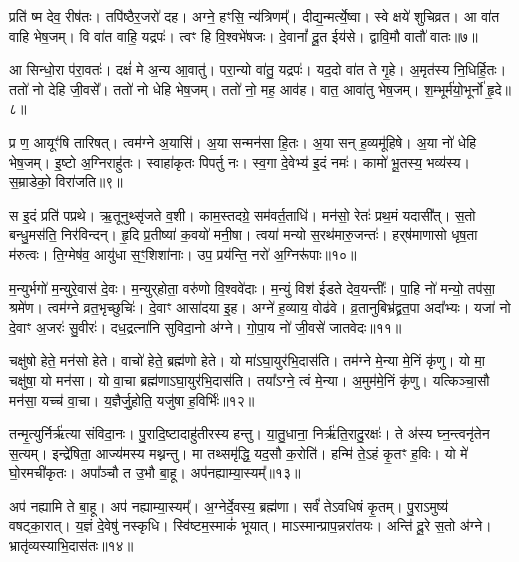 प्रति॑ ष्म देव॒ रीष॑तः।
तपि॑ष्ठैर॒जरो॑ दह।
अग्ने॒ हꣳसि॒ न्य॑त्रिणम्᳚।
दीद्य॒न्मर्त्ये॒ष्वा।
स्वे क्षये॑ शुचिव्रत।
आ वा॑त वाहि भेष॒जम्।
वि वा॑त वाहि॒ यद्रपः॑।
त्वꣳ हि वि॒श्वभे॑षजः।
दे॒वानां᳚ दू॒त ईय॑से।
द्वावि॒मौ वातौ॑ वातः॥७॥

आ सिन्धो॒रा प॑रा॒वतः॑।
दक्षं॑ मे अ॒न्य आ॒वातु॑।
परा॒न्यो वा॑तु॒ यद्रपः॑।
यद॒दो वा॑त ते गृ॒हे।
अ॒मृत॑स्य नि॒धिर्\mbox{}हि॒तः।
ततो॑ नो देहि जी॒वसे᳚।
ततो॑ नो धेहि भेष॒जम्।
ततो॑ नो॒ मह॒ आव॑ह।
वात॒ आवा॑तु भेष॒जम्।
श॒म्भूर्म॑यो॒भूर्नो॑ हृ॒दे॥८॥

प्र ण॒ आयूꣳ॑षि तारिषत्।
त्वम॑ग्ने अ॒यासि॑।
अ॒या सन्मन॑सा हि॒तः।
अ॒या सन् ह॒व्यमू॑हिषे।
अ॒या नो॑ धेहि भेष॒जम्।
इ॒ष्टो अ॒ग्निराहु॑तः।
स्वाहा॑कृतः पिपर्तु नः।
स्व॒गा दे॒वेभ्य॑ इ॒दं नमः॑।
कामो॑ भू॒तस्य॒ भव्य॑स्य।
स॒म्राडेको॒ विरा॑जति॥९॥

स इ॒दं प्रति॑ पप्रथे।
ऋ॒तूनुथ्सृ॑जते व॒शी।
काम॒स्तदग्रे॒ सम॑वर्त॒ताधि॑।
मन॑सो॒ रेतः॑ प्रथ॒मं यदासी᳚त्।
स॒तो बन्धु॒मस॑ति॒ निर॑विन्दन्।
हृ॒दि प्र॒तीष्या॑ क॒वयो॑ मनी॒षा।
त्वया॑ मन्यो स॒रथ॑मारु॒जन्तः॑।
हर्‌\mbox{}ष॑माणासो धृष॒ता म॑रुत्वः।
ति॒ग्मेष॑व॒ आयु॑धा स॒ꣳ॒शिशा॑नाः।
उप॒ प्रय॑न्ति॒ नरो॑ अ॒ग्निरू॑पाः॥१०॥

म॒न्युर्भगो॑ म॒न्युरे॒वास॑ दे॒वः।
म॒न्युर्‌\mbox{}होता॒ वरु॑णो वि॒श्ववे॑दाः।
म॒न्युं विश॑ ईडते देव॒यन्तीः᳚।
पा॒हि नो॑ मन्यो॒ तप॑सा॒ श्रमे॑ण।
त्वम॑ग्ने व्रत॒भृच्छुचिः॑।
दे॒वाꣳ आसा॑दया इ॒ह।
अग्ने॑ ह॒व्याय॒ वोढ॑वे।
व्र॒तानुबिभ्र॑द्व्रत॒पा अदा᳚भ्यः।
यजा॑ नो दे॒वाꣳ अ॒जरः॑ सु॒वीरः॑।
दध॒द्रत्ना॑नि सुविदा॒नो अ॑ग्ने।
गो॒पा॒य नो॑ जी॒वसे॑ जातवेदः॥११॥\anuvakamend[जिघाꣳ॑सत्य॒मित्रा᳚ञ्जघ॒न्वानी॑डते॒ सर्वा॒ अꣳह॑सो वातो हृ॒दे रा॑जत्य॒ग्निरू॑पाः सुविदा॒नो अ॑ग्न॒ एकं॑ च]

चक्षु॑षो हेते॒ मन॑सो हेते।
वाचो॑ हेते॒ ब्रह्म॑णो हेते।
यो मा॑\-ऽघा॒युर॑भि॒दास॑ति।
तम॑ग्ने मे॒न्या मे॒निं कृ॑णु।
यो मा॒ चक्षु॑षा॒ यो मन॑सा।
यो वा॒चा ब्रह्म॑णा\-ऽघा॒युर॑भि॒दास॑ति।
तया᳚ऽग्ने॒ त्वं मे॒न्या।
अ॒मुम॑मे॒निं कृ॑णु।
यत्किञ्चा॒सौ मन॑सा॒ यच्च॑ वा॒चा।
य॒ज्ञैर्जु॒होति॒ यजु॑षा ह॒विर्भिः॑॥१२॥

तन्मृ॒त्युर्निर्\mbox{}ऋ॑त्या संविदा॒नः।
पु॒रादि॒ष्टादाहु॑तीरस्य हन्तु।
या॒तु॒धाना॒ निर्\mbox{}ऋ॑ति॒रादु॒रक्षः॑।
ते अ॑स्य घ्न॒न्त्वनृ॑तेन स॒त्यम्।
इन्द्रे॑षिता॒ आज्य॑मस्य मथ्नन्तु।
मा तथ्समृ॑द्धि॒ यद॒सौ क॒रोति॑।
हन्मि॑ ते॒ऽहं कृ॒तꣳ ह॒विः।
यो मे॑ घो॒रमची॑कृतः।
अपा᳚ञ्चौ त उ॒भौ बा॒हू।
अप॑नह्याम्या॒स्यम्᳚॥१३॥

अप॑ नह्यामि ते बा॒हू।
अप॑ नह्याम्या॒स्यम्᳚।
अ॒ग्नेर्दे॒वस्य॒ ब्रह्म॑णा।
सर्वं॑ तेऽवधिषं कृ॒तम्।
पु॒रा\-ऽमुष्य॑ वषट्का॒रात्।
य॒ज्ञं दे॒वेषु॑ नस्कृधि।
स्वि॑ष्टम॒स्माकं॑ भूयात्।
माऽस्मान्प्राप॒न्न\-रा॑तयः।
अन्ति॑ दू॒रे स॒तो अ॑ग्ने।
भ्रातृ॑व्यस्याभि॒दास॑तः॥१४॥


